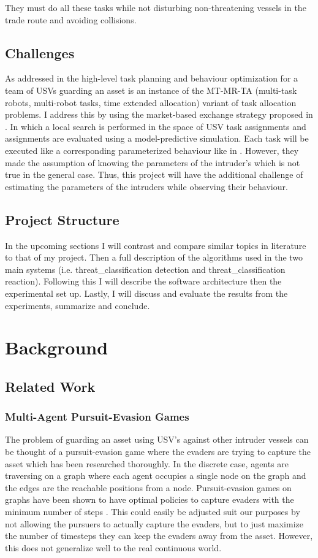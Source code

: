 \documentclass[bsc,frontabs,twoside,singlespacing,parskip,deptreport]{infthesis}     %
\begin{document}
They must do all these tasks while not disturbing non-threatening vessels in the trade route and avoiding collisions.

\section{Challenges}
As addressed in \cite{raboin2013model} the high-level task planning and behaviour optimization for a team of USVs guarding an asset is an instance of the MT-MR-TA (multi-task robots, multi-robot tasks, time extended allocation) variant of task allocation problems. I address this by using the market-based exchange strategy proposed in \cite{raboin2013model}. In which a local search is performed in the space of USV task assignments and assignments are evaluated using a model-predictive simulation. Each task will be executed like a corresponding parameterized behaviour like in \cite{raboin2013model}. However, they made the assumption of knowing the parameters of the intruder's which is not true in the general case. Thus, this project will have the additional challenge of estimating the parameters of the intruders while observing their behaviour.

\section{Project Structure}
In the upcoming sections I will contrast and compare similar topics in literature to that of my project. Then a full description of the algorithms used in the two main systems (i.e. threat_classification detection and threat_classification reaction). Following this I will describe the software architecture then the experimental set up. Lastly, I will discuss and evaluate the results from the experiments, summarize and conclude.

\chapter{Background}

\section{Related Work}

\subsection{Multi-Agent Pursuit-Evasion Games}
The problem of guarding an asset using USV’s against other intruder vessels can be thought of a pursuit-evasion game where the evaders are trying to capture the asset which has been researched thoroughly. In the discrete case, agents are traversing on a graph where each agent occupies a single node on the graph and the edges are the reachable positions from a node. Pursuit-evasion games on graphs have been shown to have optimal policies to capture evaders with the minimum number of steps \cite{vieira2008optimal}. This could easily be adjusted suit our purposes by not allowing the pursuers to actually capture the evaders, but to just maximize the number of timesteps they can keep the evaders away from the asset. However, this does not generalize well to the real continuous world.
\end{document}
